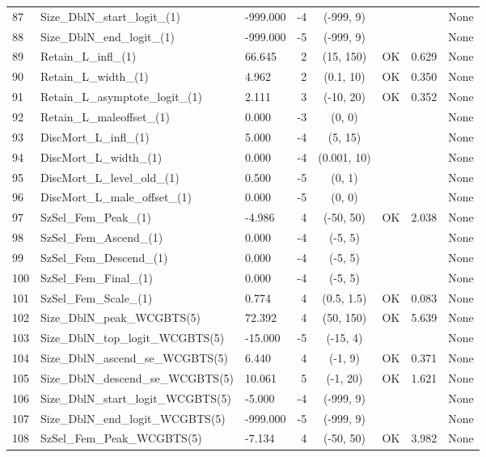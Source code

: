 \documentclass[12pt,]{article}
\begin{document}
\begin{landscape}
\begin{longtable}{lp{2.5in}lrcccl}
  87 & Size\_DblN\_start\_logit\_(1) & -999.000 & -4 & (-999, 9) &  &  & None \\ 
  88 & Size\_DblN\_end\_logit\_(1) & -999.000 & -5 & (-999, 9) &  &  & None \\ 
  89 & Retain\_L\_infl\_(1) & 66.645 & 2 & (15, 150) & OK & 0.629 & None \\ 
  90 & Retain\_L\_width\_(1) & 4.962 & 2 & (0.1, 10) & OK & 0.350 & None \\ 
  91 & Retain\_L\_asymptote\_logit\_(1) & 2.111 & 3 & (-10, 20) & OK & 0.352 & None \\ 
  92 & Retain\_L\_maleoffset\_(1) & 0.000 & -3 & (0, 0) &  &  & None \\ 
  93 & DiscMort\_L\_infl\_(1) & 5.000 & -4 & (5, 15) &  &  & None \\ 
  94 & DiscMort\_L\_width\_(1) & 0.000 & -4 & (0.001, 10) &  &  & None \\ 
  95 & DiscMort\_L\_level\_old\_(1) & 0.500 & -5 & (0, 1) &  &  & None \\ 
  96 & DiscMort\_L\_male\_offset\_(1) & 0.000 & -5 & (0, 0) &  &  & None \\ 
  97 & SzSel\_Fem\_Peak\_(1) & -4.986 & 4 & (-50, 50) & OK & 2.038 & None \\ 
  98 & SzSel\_Fem\_Ascend\_(1) & 0.000 & -4 & (-5, 5) &  &  & None \\ 
  99 & SzSel\_Fem\_Descend\_(1) & 0.000 & -4 & (-5, 5) &  &  & None \\ 
  100 & SzSel\_Fem\_Final\_(1) & 0.000 & -4 & (-5, 5) &  &  & None \\ 
  101 & SzSel\_Fem\_Scale\_(1) & 0.774 & 4 & (0.5, 1.5) & OK & 0.083 & None \\ 
  102 & Size\_DblN\_peak\_WCGBTS(5) & 72.392 & 4 & (50, 150) & OK & 5.639 & None \\ 
  103 & Size\_DblN\_top\_logit\_WCGBTS(5) & -15.000 & -5 & (-15, 4) &  &  & None \\ 
  104 & Size\_DblN\_ascend\_se\_WCGBTS(5) & 6.440 & 4 & (-1, 9) & OK & 0.371 & None \\ 
  105 & Size\_DblN\_descend\_se\_WCGBTS(5) & 10.061 & 5 & (-1, 20) & OK & 1.621 & None \\ 
  106 & Size\_DblN\_start\_logit\_WCGBTS(5) & -5.000 & -4 & (-999, 9) &  &  & None \\ 
  107 & Size\_DblN\_end\_logit\_WCGBTS(5) & -999.000 & -5 & (-999, 9) &  &  & None \\ 
  108 & SzSel\_Fem\_Peak\_WCGBTS(5) & -7.134 & 4 & (-50, 50) & OK & 3.982 & None \\ 

\end{longtable}
\end{landscape}
\end{document}
